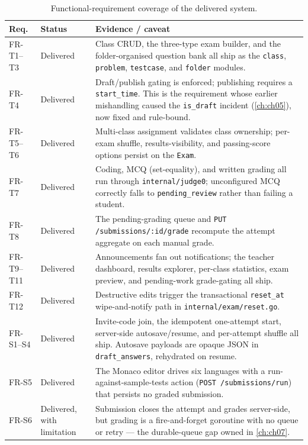 \begin{table}[htbp]
\centering
\caption{Functional-requirement coverage of the delivered system.}
\label{tab:res-fr}
\small
\begin{tabularx}{\textwidth}{@{}L{1.5cm} L{2.9cm} X@{}}
\toprule
\textbf{Req.} & \textbf{Status} & \textbf{Evidence / caveat} \\
\midrule
FR-T1--T3 & Delivered & Class CRUD, the three-type exam builder, and the
folder-organised question bank all ship as the \texttt{class}, \texttt{problem},
\texttt{testcase}, and \texttt{folder} modules. \\
FR-T4 & Delivered & Draft/publish gating is enforced; publishing requires a
\texttt{start\_time}. This is the requirement whose earlier mishandling caused the
\texttt{is\_draft} incident (\cref{ch:ch05}), now fixed and rule-bound. \\
FR-T5--T6 & Delivered & Multi-class assignment validates class ownership; per-exam
shuffle, results-visibility, and passing-score options persist on the \texttt{Exam}. \\
FR-T7 & Delivered & Coding, MCQ (set-equality), and written grading all run through
\texttt{internal/judge0}; unconfigured MCQ correctly falls to \texttt{pending\_review}
rather than failing a student. \\
FR-T8 & Delivered & The pending-grading queue and \texttt{PUT /submissions/:id/grade}
recompute the attempt aggregate on each manual grade. \\
FR-T9--T11 & Delivered & Announcements fan out notifications; the teacher dashboard,
results explorer, per-class statistics, exam preview, and pending-work grade-gating
all ship. \\
FR-T12 & Delivered & Destructive edits trigger the transactional \texttt{reset\_at}
wipe-and-notify path in \texttt{internal/exam/reset.go}. \\
\addlinespace
FR-S1--S4 & Delivered & Invite-code join, the idempotent one-attempt start,
server-side autosave/resume, and per-attempt shuffle all ship. Autosave payloads are
opaque JSON in \texttt{draft\_answers}, rehydrated on resume. \\
FR-S5 & Delivered & The Monaco editor drives six languages with a
run-against-sample-tests action (\texttt{POST /submissions/run}) that persists no
graded submission. \\
FR-S6 & Delivered, with limitation & Submission closes the attempt and grades
server-side, but grading is a fire-and-forget goroutine with no queue or retry ---
the durable-queue gap owned in \cref{ch:ch07}. \\

\end{tabularx}
\end{table}
